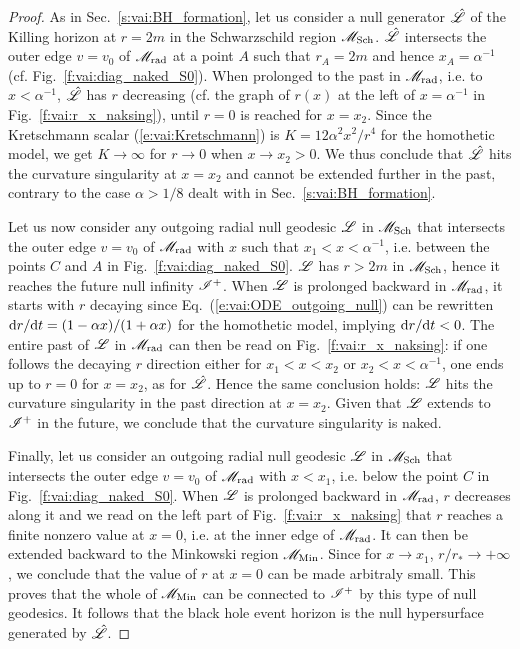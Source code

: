 \begin{proof}
As in Sec.~\ref{s:vai:BH_formation}, let us consider a null generator
$\hat{\mathscr{L}}$ of the Killing horizon at $r=2m$ in the Schwarzschild region
$\mathscr{M}_{\rm Sch}$.
$\hat{\mathscr{L}}$ intersects the outer edge $v=v_0$ of $\mathscr{M}_{\rm rad}$ at a
point $A$ such that $r_A=2m$ and hence $x_A=\alpha^{-1}$ (cf. Fig.~\ref{f:vai:diag_naked_S0}). When
prolonged to the past in $\mathscr{M}_{\rm rad}$, i.e. to $x < \alpha^{-1}$,
$\hat{\mathscr{L}}$ has $r$ decreasing (cf. the graph of $r(x)$ at the left of
$x=\alpha^{-1}$ in Fig.~\ref{f:vai:r_x_naksing}), until $r=0$ is reached for
$x=x_2$. Since the Kretschmann scalar (\ref{e:vai:Kretschmann}) is
$K = 12 \alpha^2 x^2 / r^4$ for the homothetic model, we get $K\to \infty$
for $r\to 0$ when $x\to x_2 > 0$. We thus conclude that $\hat{\mathscr{L}}$ hits
the curvature singularity at $x=x_2$ and cannot be extended further in the
past, contrary to the case $\alpha > 1/8$ dealt with in Sec.~\ref{s:vai:BH_formation}.

Let us now consider any outgoing radial null geodesic $\mathscr{L}$ in $\mathscr{M}_{\rm Sch}$
that intersects the outer edge $v=v_0$ of $\mathscr{M}_{\rm rad}$ with
$x$ such that $x_1 < x < \alpha^{-1}$, i.e. between the points $C$ and $A$
in Fig.~\ref{f:vai:diag_naked_S0}. $\mathscr{L}$ has $r> 2m$ in $\mathscr{M}_{\rm Sch}$,
hence it reaches the future null infinity $\mathscr{I}^+$. When $\mathscr{L}$
is prolonged backward in $\mathscr{M}_{\rm rad}$, it starts with
$r$ decaying since
Eq.~(\ref{e:vai:ODE_outgoing_null}) can be rewritten $\mathrm{d} r/\mathrm{d} t = (1 - \alpha x)/(1 + \alpha x)$
for the homothetic model, implying $\mathrm{d} r / \mathrm{d} t <0$. The entire past of $\mathscr{L}$ in $\mathscr{M}_{\rm rad}$ can then be read on Fig.~\ref{f:vai:r_x_naksing}: if one
follows the decaying $r$ direction either for $x_1 < x < x_2$ or $x_2 < x < \alpha^{-1}$,
one ends up to $r=0$ for $x=x_2$, as for $\hat{\mathscr{L}}$. Hence the same conclusion holds:
$\mathscr{L}$ hits the curvature singularity in the past direction at $x=x_2$.
Given that $\mathscr{L}$ extends to $\mathscr{I}^+$ in the future, we conclude that
the curvature singularity is naked.

Finally, let us consider an outgoing radial null geodesic $\mathscr{L}$ in $\mathscr{M}_{\rm Sch}$ that intersects the outer edge $v=v_0$ of $\mathscr{M}_{\rm rad}$ with
$x < x_1$, i.e. below the point $C$ in Fig.~\ref{f:vai:diag_naked_S0}. When $\mathscr{L}$ is prolonged backward in $\mathscr{M}_{\rm rad}$, $r$ decreases along it
and we read on the left part of Fig.~\ref{f:vai:r_x_naksing} that $r$ reaches
a finite nonzero value at $x=0$, i.e. at the inner edge of $\mathscr{M}_{\rm rad}$. It can then be extended backward to the Minkowski region $\mathscr{M}_{\rm Min}$.
Since for $x\to x_1$, $r/r_*\to +\infty$, we conclude that the value of $r$
at $x=0$ can be made arbitraly small. This proves that the whole of $\mathscr{M}_{\rm Min}$ can be connected to $\mathscr{I}^+$ by this type of null geodesics. It follows
that the black hole event horizon is the null hypersurface generated by $\hat{\mathscr{L}}$.
\end{proof}


